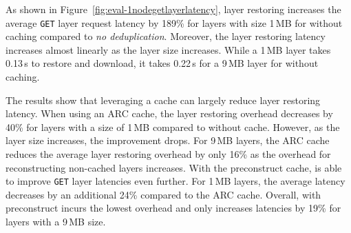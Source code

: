 %
As shown in Figure~\ref{fig:eval-1nodegetlayerlatency}, 
layer restoring increases the average \texttt{GET} layer request latency by 189\% for layers 
with size 1\,MB for \sysname without caching compared to \emph{no deduplication}.
%
Moreover, the layer restoring latency increases almost linearly as the layer size increases.
%
While a 1\,MB layer takes 0.13\,s to restore and download, 
it takes 0.22\,s for a 9\,MB layer for \sysname without caching.

%
The results show that
leveraging a cache can largely reduce layer restoring latency.
%
When using an ARC cache, the layer restoring overhead decreases by 40\% for layers with
a size of 1\,MB compared to \sysname without cache.
%
However, as the layer size increases,  the improvement drops.
%
For 9\,MB layers, the ARC cache reduces the average layer restoring overhead by only 16\%
as the overhead for reconstructing non-cached layers increases.
%
%
With the preconstruct cache, \sysname is able to improve \texttt{GET} layer latencies even further.
%
For 1\,MB layers, the average latency decreases by an additional 24\% compared to the ARC cache.
%
Overall, \sysname with preconstruct incurs the lowest overhead and only increases latencies by
19\% for layers with a 9\,MB size. 

